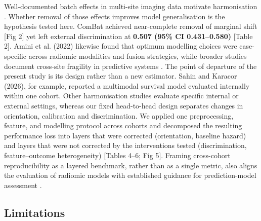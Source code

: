 \documentclass[a4paper,fleqn]{cas-sc}
\begin{document}
Well-documented batch effects in multi-site imaging data motivate harmonisation \citep{johnson2007,fortin2018}. Whether removal of those effects improves model generalisation is the hypothesis tested here. ComBat achieved near-complete removal of marginal shift [Fig 2] yet left external discrimination at \textbf{0.507 (95\% CI 0.431--0.580)} [Table 2]. Amini et al. (2022) likewise found that optimum modelling choices were case-specific across radiomic modalities and fusion strategies, while broader studies document cross-site fragility in predictive systems \citep{zech2018,wynants2020}. The point of departure of the present study is its design rather than a new estimator. Sahin and Karacor (2026), for example, reported a multimodal survival model evaluated internally within one cohort. Other harmonisation studies evaluate specific internal or external settings, whereas our fixed head-to-head design separates changes in orientation, calibration and discrimination. We applied one preprocessing, feature, and modelling protocol across cohorts and decomposed the resulting performance loss into layers that were corrected (orientation, baseline hazard) and layers that were not corrected by the interventions tested (discrimination, feature--outcome heterogeneity) [Tables 4--6; Fig 5]. Framing cross-cohort reproducibility as a layered benchmark, rather than as a single metric, also aligns the evaluation of radiomic models with established guidance for prediction-model assessment \citep{collins2015,collins2024,tejani2024}.

\subsection{Limitations}
\end{document}
